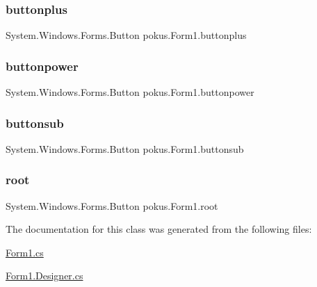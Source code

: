 \subsubsection{\texorpdfstring{buttonplus}{buttonplus}}
{\footnotesize\ttfamily System.\+Windows.\+Forms.\+Button pokus.\+Form1.\+buttonplus}

\mbox{\label{classpokus_1_1Form1_a627ac5a2200ea94b232a465ccf7ad883}} 
\subsubsection{\texorpdfstring{buttonpower}{buttonpower}}
{\footnotesize\ttfamily System.\+Windows.\+Forms.\+Button pokus.\+Form1.\+buttonpower}

\mbox{\label{classpokus_1_1Form1_a192b6a454ea0c3b9c2472b55301ad3e9}} 
\subsubsection{\texorpdfstring{buttonsub}{buttonsub}}
{\footnotesize\ttfamily System.\+Windows.\+Forms.\+Button pokus.\+Form1.\+buttonsub}

\mbox{\label{classpokus_1_1Form1_a7717a2a50c484f641bdcc54cd679a193}} 
\subsubsection{\texorpdfstring{root}{root}}
{\footnotesize\ttfamily System.\+Windows.\+Forms.\+Button pokus.\+Form1.\+root}



The documentation for this class was generated from the following files\+:\begin{DoxyCompactItemize}
\item 
\hyperlink{Form1_8cs}{Form1.\+cs}\item 
\hyperlink{Form1_8Designer_8cs}{Form1.\+Designer.\+cs}\end{DoxyCompactItemize}
